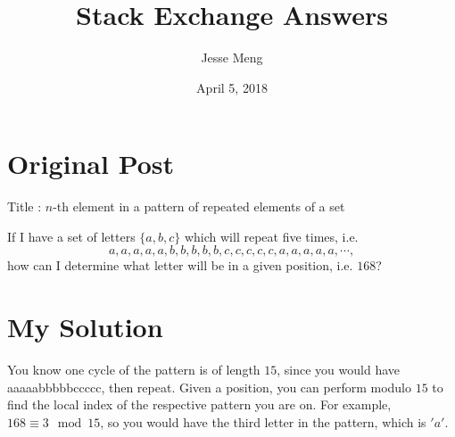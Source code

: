 \documentclass{article}
\title{Stack Exchange Answers}
\author{Jesse Meng }
\date{April 5, 2018}
\begin{document}
\maketitle

\section{Original Post}
Title : $n$-th element in a pattern of repeated elements of a set

If I have a set of letters $\{a,b,c\}$ which will repeat five times, i.e.
$$a,a,a,a,a,b,b,b,b,b,c,c,c,c,c,a,a,a,a,a,\cdots,$$
how can I determine what letter will be in a given position, i.e. $168$?
 
\section{My Solution}
You know one cycle of the pattern is of length $15$, since you would have {aaaaabbbbbccccc}, then repeat. Given a position, you can perform modulo $15$ to find the local index of the respective pattern you are on. For example, $168\equiv 3 \mod 15$, so you would have the third letter in the pattern, which is $'a'$.
\end{document}

